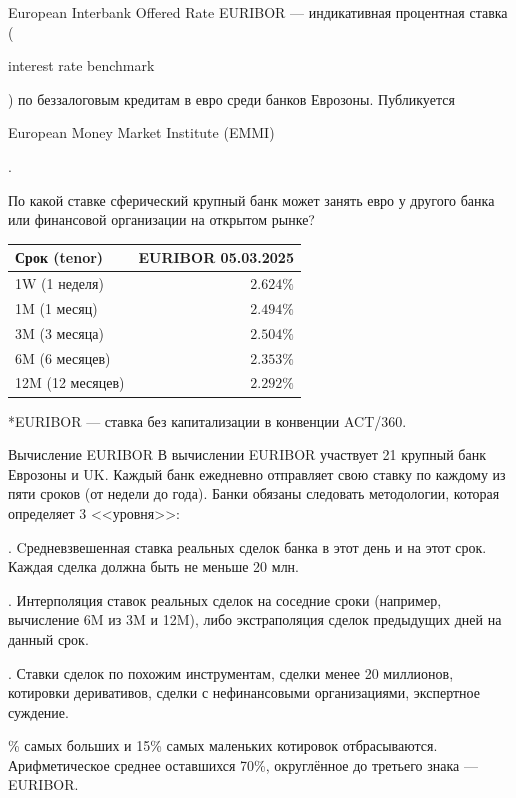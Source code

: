 \documentclass{beamer}
\newcommand{\en}[1]{\begin{otherlanguage}{english}#1\end{otherlanguage}}
\begin{document}
\begin{frame}{European Interbank Offered Rate}
\justify
\alert{EURIBOR} --- индикативная процентная ставка (\en{interest rate benchmark}) по беззалоговым кредитам в евро среди банков Еврозоны. Публикуется \en{European Money Market Institute (EMMI)}.

\justify
По какой ставке сферический крупный банк может занять евро у другого банка или финансовой организации на открытом рынке? 

\justify
\centering
\begin{tabular}{l|r}
Срок (tenor)     & EURIBOR 05.03.2025 \\ \hline
1W (1 неделя)    & $2.624\%$ \\
1M (1 месяц)     & $2.494\%$ \\
3M (3 месяца)    & $2.504\%$ \\
6M (6 месяцев)   & $2.353\%$ \\
12M (12 месяцев) & $2.292\%$ 
\end{tabular}

\justify
*EURIBOR --- ставка без капитализации в конвенции ACT/360.
\end{frame}



\begin{frame}{Вычисление EURIBOR}
\justify
В вычислении EURIBOR участвует 21 крупный банк Еврозоны и UK. Каждый банк ежедневно отправляет свою ставку по каждому из пяти сроков (от недели до года). Банки обязаны следовать методологии, которая определяет 3 <<уровня>>:

. Cредневзвешенная ставка реальных сделок банка в этот день и на этот срок. Каждая сделка должна быть не меньше 20 млн.

. Интерполяция ставок реальных сделок на соседние сроки (например, вычисление 6M из 3M и 12M), либо экстраполяция сделок предыдущих дней на данный срок.

. Ставки сделок по похожим инструментам, сделки менее 20 миллионов, котировки деривативов, сделки с нефинансовыми организациями, экспертное суждение. 

\% самых больших и 15\% самых маленьких котировок отбрасываются. Арифметическое среднее оставшихся 70\%, округлённое до третьего знака --- EURIBOR.
\end{frame}
\end{document}
